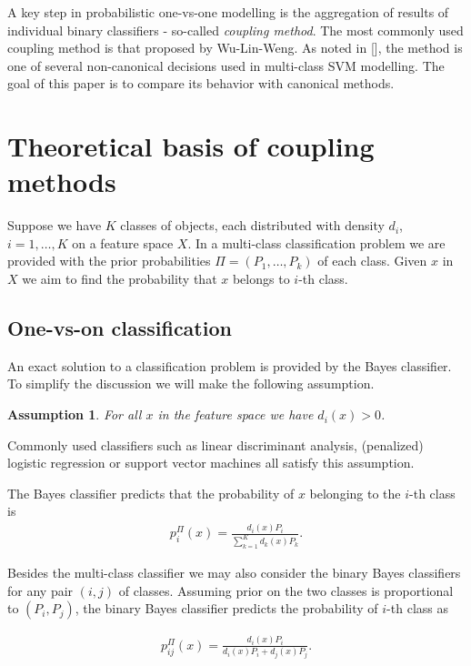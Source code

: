 \documentclass[twoside,11pt]{article}
\newtheorem{assumption}{Assumption}
\begin{document}
A key step in probabilistic one-vs-one modelling is the aggregation of results of individual binary classifiers - so-called \emph{coupling method}. The most commonly used coupling method is that proposed by Wu-Lin-Weng. As noted in [\cite{dohau}], the method is one of several non-canonical decisions used in multi-class SVM modelling. The goal of this paper is to compare its behavior with canonical methods. 


\section{Theoretical basis of coupling methods}

Suppose we have $K$ classes of objects, each distributed with density $d_i$, $i=1,\ldots, K$ on a feature space $X$. In a multi-class classification problem we are provided with the prior probabilities $\Pi = (P_1, \ldots, P_k)$ of each class. Given $x$ in $X$ we aim to find the probability that $x$ belongs to $i$-th class. 


\subsection{One-vs-on classification}

An exact solution to a classification problem is provided by the Bayes classifier. To simplify the discussion we will make the following assumption.

\begin{assumption} \label{ass:1}
For all $x$ in the feature space we have $d_i(x) > 0$.
\end{assumption}
Commonly used classifiers such as linear discriminant analysis, (penalized) logistic regression or support vector machines all satisfy this assumption.

The Bayes classifier predicts that the probability of $x$ belonging to the $i$-th class is
\begin{align}
 p^\Pi_i(x) = \frac{d_i(x) P_i}{\sum_{k=1}^K d_k(x)P_k}.
\end{align}

Besides the multi-class classifier we may also consider the binary Bayes classifiers for any pair $(i,j)$ of classes. Assuming prior on the two classes is proportional to $(P_i, P_j)$, the binary Bayes classifier predicts the probability of $i$-th class as 

\begin{align}
	p_{ij}^\Pi(x) = \frac{d_i(x) P_i}{d_i(x)P_i + d_j(x)P_j}.
\end{align}
\end{document}

